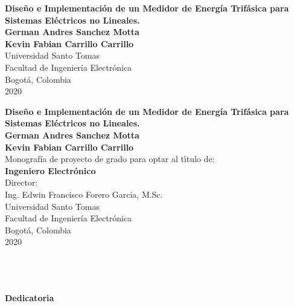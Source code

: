 \begin{center}
\setcounter{page}{1}
\thispagestyle{empty} \vspace*{0cm} \huge\textbf{
Diseño e Implementaci\'{o}n de un Medidor de Energ\'{i}a Trif\'{a}sica para Sistemas El\'{e}ctricos no Lineales. }\\[6.0cm]
\Large\textbf{German Andres Sanchez Motta\\Kevin Fabian Carrillo Carrillo}\\[6.0cm]
\small Universidad Santo Tomas\\
Facultad de Ingenier\'{i}a Electr\'{o}nica\\
Bogot\'{a}, Colombia\\
2020\\
\end{center}

\newpage{\pagestyle{empty}\clearpage}

\newpage
\begin{center}
\thispagestyle{empty} \vspace*{0cm} \huge\textbf{
Diseño e Implementaci\'{o}n de un Medidor de Energ\'{i}a Trif\'{a}sica para Sistemas El\'{e}ctricos no Lineales. }\\[2.5cm]
\Large\textbf{German Andres Sanchez Motta\\Kevin Fabian Carrillo Carrillo}\\[2.5cm]
\small Monograf\'{i}a de proyecto de grado para optar al
t\'{\i}tulo de:\\
\textbf{Ingeniero Electr\'{o}nico }\\[2.5cm]

Director:\\
Ing. Edwin Francisco Forero Garcia, M.Sc.\\[3.7cm]




Universidad Santo Tomas\\
Facultad de Ingenier\'{i}a Electr\'{o}nica \\
Bogot\'{a}, Colombia\\
2020\\
\end{center}


\newpage{\clearpage}
\thispagestyle{empty} \textbf{}\normalsize
\\\\\\%
\textbf{\LARGE Dedicatoria}\\[4.0cm]
\setcounter{page}{3}
\\\\

